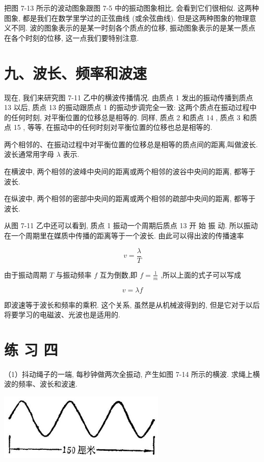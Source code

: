 \documentclass[10pt]{article}
\begin{document}
把图 7-13 所示的波动图象跟图 7-5 中的振动图象相比, 会看到它们很相似. 这两种图象, 都是我们在数学里学过的正弦曲线 (或余弦曲线). 但是这两种图象的物理意义不同. 波的图象表示的是某一时刻各个质点的位移, 振动图象表示的是某一质点在各个时刻的位移, 这一点我们要特别注意.

\section*{九、波长、频率和波速}

现在, 我们来研究图 7-11 乙中的横波传播情况. 由质点 1 发出的振动传播到质点 13 以后, 质点 13 的振动跟质点 1 的振动步调完全一致: 这两个质点在振动过程中的任何时刻, 对平衡位置的位移总是相等的. 同样, 质点 2 和质点 14 , 质点 3 和质点 15 , 等等, 在振动中的任何时刻对平衡位置的位移也总是相等的.

两个相邻的、在振动过程中对平衡位置的位移总是相等的质点间的距离,叫做波长. 波长通常用字母 \(\lambda\) 表示.

在横波中, 两个相邻的波峰中央间的距离或两个相邻的波谷中央间的距离, 都等于波长.

在纵波中, 两个相邻的密部中央间的距离或两个相邻的疏部中央间的距离, 都等于波长.

从图 7-11 乙中还可以看到, 质点 1 振动一个周期后质点 13 开 始 振 动. 所以振动在一个周期里在媒质中传播的距离等于一个波长. 由此可以得出波的传播速率

\[
v = \frac{\lambda }{T}
\]

由于振动周期 \(T\) 与振动频率 \(f\) 互为倒数,即 \(f = \frac{1}{m}\) ,所以上面的式子可以写成

\[
v = {\lambda f}
\]

即波速等于波长和频率的乘积. 这个关系, 虽然是从机械波得到的, 但是它对于以后将要学习的电磁波、光波也是适用的.

\section*{练 习 四}

（1）抖动绳子的一端, 每秒钟做两次全振动, 产生如图 7-14 所示的横波. 求绳上横波的频率、波长和波速.

\begin{center}
\includegraphics[max width=0.6\textwidth]{images/01912d55-147c-70aa-b0e0-1782a122f948_210_763426.jpg}
\end{center}
\end{document}
